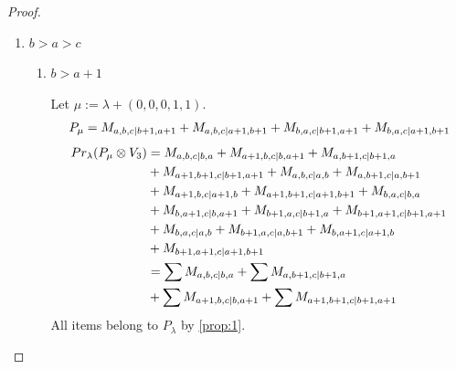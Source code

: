 \begin{proof}
\begin{enumerate}
\begin{enumerate}
\begin{table}[htbp]
\begin{tabular}{cc}
{ $M_{b+4,b+3,b|b+3,b+4}$, \\
 $M_{b+3,b+4,b|b+3,b+4}$
}\\
 & \\
 $P_{b+3,b,b+2|b+2,b+3}$ & \makecell{
 $M_{b+4,b,b+2|b+2,b+4}$,
 $M_{b+3,b,b+3|b+3,b+3}$,
 $M_{b+4,b,b+3|b+4,b+3}$,
 $M_{b+4,b,b+3|b+3,b+4}$, \\
 $M_{b+3,b,b+4|b+3,b+4}$,
 $M_{b+4,b+2,b|b+2,b+4}$,
 $M_{b+3,b+3,b|b+3,b+3}$,
 $M_{b+4,b+3,b|b+4,b+3}$, \\
 $M_{b+4,b+3,b|b+3,b+4}$,
 $M_{b+3,b+4,b|b+3,b+4}$
}\\
\bottomrule
\end{tabular}
\vspace{0.5em}
\parbox{\linewidth}{\small
\textbf{Interpretation:}
This table displays only selected computational results. This partial presentation does not affect our conclusion.
}
\end{table}
      \end{enumerate}

    \item $b>a>c$
      \begin{enumerate}
        \item $b>a+1$ \par
        Let $\mu:=\lambda + (0,0,0,1,1) $.
        \begin{equation}\notag
          \begin{aligned}
            P_\mu = M_{a,b,c|b+1,a+1}
+ M_{a,b,c|a+1,b+1}
+ M_{b,a,c|b+1,a+1}
+ M_{b,a,c|a+1,b+1}
          \end{aligned}
        \end{equation}
        \begin{equation}\notag
          \begin{aligned}
            Pr_{\lambda}(P_\mu \otimes V_{3}) &=
M_{a,b,c|b,a}
+ M_{a+1,b,c|b,a+1}
+ M_{a,b+1,c|b+1,a}\\
                                              &
+ M_{a+1,b+1,c|b+1,a+1}
+ M_{a,b,c|a,b}
+ M_{a,b+1,c|a,b+1}\\
                                              &
+ M_{a+1,b,c|a+1,b}
+ M_{a+1,b+1,c|a+1,b+1}
+ M_{b,a,c|b,a}\\
                                              &
+ M_{b,a+1,c|b,a+1}
+ M_{b+1,a,c|b+1,a}
+ M_{b+1,a+1,c|b+1,a+1}\\
                                              &
+ M_{b,a,c|a,b}
+ M_{b+1,a,c|a,b+1}
+ M_{b,a+1,c|a+1,b}\\
                                              &
+ M_{b+1,a+1,c|a+1,b+1} \\
                                               &=
\sum M_{a,b,c|b,a}
+ \sum M_{a,b+1,c|b+1,a}\\
                                              &
+ \sum M_{a+1,b,c|b,a+1}
+ \sum M_{a+1,b+1,c|b+1,a+1}
          \end{aligned}
        \end{equation}
All items belong to $P_\lambda$ by \cref{prop:1}.


\end{enumerate}
\end{enumerate}
\end{proof}
